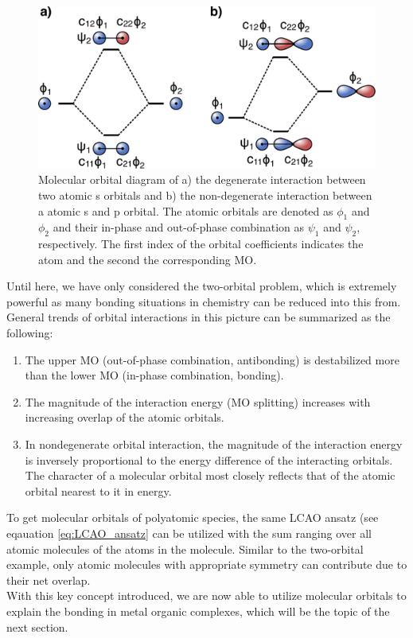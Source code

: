 \begin{figure}[H]
    \centering
    \includegraphics[width=0.95\linewidth]{Figures/MO_diagram_degenreate_and_non_degenerate.pdf}
    \caption{Molecular orbital diagram of a) the degenerate interaction between two atomic s orbitals and b) the non-degenerate interaction between a atomic s and p orbital. The atomic orbitals are denoted as $\phi_{1}$ and $\phi_{2}$ and their in-phase and out-of-phase combination as $\psi_{1}$  and $\psi_{2}$, respectively. The first index of the orbital coefficients indicates the atom and the second the corresponding MO.}
    \label{fig:MO_diagrams}
\end{figure}
\noindent
Until here, we have only considered the two-orbital problem, which is extremely powerful as many bonding situations in chemistry can be reduced into this from. General trends of orbital interactions in this picture can be summarized as the following:
\begin{enumerate}
    \item The upper MO (out-of-phase combination, antibonding) is destabilized more than the lower MO (in-phase combination, bonding).
    \item The magnitude of the interaction energy (MO splitting) increases with increasing overlap of the atomic orbitals.
    \item In nondegenerate orbital interaction, the magnitude of the interaction energy is inversely proportional to the energy difference of the interacting orbitals. The character of a molecular orbital most closely reflects that of the atomic orbital nearest to it in energy.
\end{enumerate}
To get molecular orbitals of polyatomic species, the same LCAO ansatz (see eqauation \ref{eq:LCAO_ansatz} can be utilized with the sum ranging over all atomic molecules of the atoms in the molecule. Similar to the two-orbital example, only atomic molecules with appropriate symmetry can contribute due to their net overlap. \\
With this key concept introduced, we are now able to utilize molecular orbitals to explain the bonding in metal organic complexes, which will be the topic of the next section.

